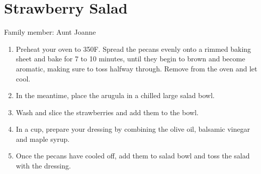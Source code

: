 \chapter{Strawberry Salad}
\label{ch:strawberrysalad}


Family member: Aunt Joanne

\begin{enumerate}
    \item Preheat your oven to 350\degree F. Spread the pecans evenly onto a rimmed baking sheet and bake for 7 to 10 minutes, until they begin to brown and become aromatic, making sure to toss halfway through. Remove from the oven and let cool.
    \item In the meantime, place the arugula in a chilled large salad bowl.
    \item Wash and slice the strawberries and add them to the bowl.
    \item In a cup, prepare your dressing by combining the olive oil, balsamic vinegar and maple syrup.
    \item Once the pecans have cooled off, add them to salad bowl and toss the salad with the dressing.
\end{enumerate}
